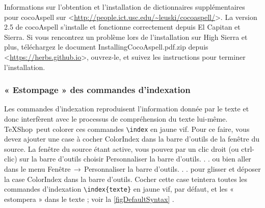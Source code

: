 \documentclass[11pt,french]{article}
\newcommand{\TS}{\textsf{\TeX Shop}}
\newcommand{\cmd}[1]{\textsf{#1}}
\newcommand{\mnu}[1]{\textsf{#1}}
\newcommand{\To}{\,\(\to\)\,}
\begin{document}
Informations sur l'obtention et l'installation de dictionnaires supplémentaires pour \cmd{cocoAspell} sur <\url{http://people.ict.usc.edu/~leuski/cocoaspell/}>. La version 2.5 de \cmd{cocoAspell} s'installe et fonctionne correctement depuis \cmd{El Capitan} et \cmd{Sierra}. Si vous rencontrez un problème lors de l'installation sur \cmd{High Sierra} et plus, téléchargez le document \cmd{InstallingCocoAspell.pdf.zip} depuis <\url {https://herbs.github.io}>, ouvrez-le, et suivez les instructions pour terminer l'installation.

\subsubsection{« Estompage » des commandes d'indexation}\label{secIndex}


Les commandes d'indexation reproduisent l'information donnée par le texte et donc interfèrent avec le processus de compréhension du texte lui-même. \TS\ peut colorer ces commandes \verb+\index+ en jaune vif. Pour ce faire, vous devez ajouter une case à cocher \cmd{ColorIndex} dans la barre d'outils de la fenêtre du source. La fenêtre du source étant active, vous pouvez par un clic droit (ou \cmd{ctrl-clic}) sur la barre d'outils choisir \mnu{Personnaliser la barre d'outils. . .} ou bien aller dans le menu \mnu{Fenêtre}\To\mnu{Personnaliser la barre d'outils. . .} pour glisser et déposer la case \cmd{ColorIndex} dans la barre d'outils. Cocher cette case teintera toutes les commandes d'indexation \verb+\index{texte}+ en jaune vif, par défaut, et les « estompera » dans le texte ; voir la \cref{figDefaultSyntax} .
\end{document}
